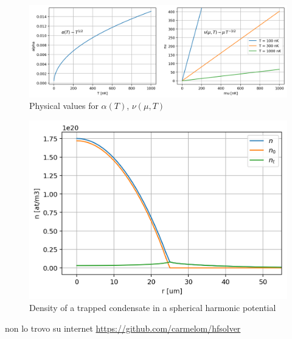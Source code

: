 \documentclass{article}
\begin{document}
\begin{figure}
  \centering
  \includegraphics[width=\textwidth]{figures/fig_alpha_nu}
  \caption{Physical values for $\alpha(T)$, $\nu(\mu, T)$}
  \label{fig:alpha_nu}
\end{figure}

\begin{figure}
  \centering
  \includegraphics[width=\textwidth]{figures/fig_harmonic_trap}
  \caption{Density of a trapped condensate in a spherical harmonic potential}
  \label{fig:harmonic_trap}
\end{figure}

\begin{thebibliography}{}
\pagestyle{headings}
 non lo trovo su internet
 \url{https://github.com/carmelom/hfsolver}
\end{thebibliography}
\end{document}
